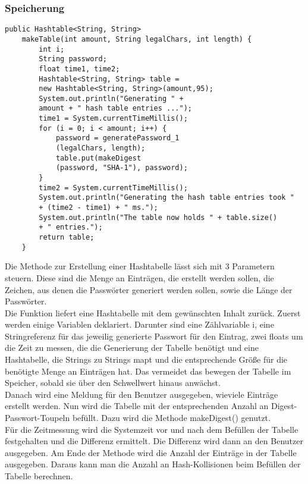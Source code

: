 \documentclass[11pt]{article}
\begin{document}
\subsubsection{Speicherung}
\begin{lstlisting}[caption=Algorithmus zur Füllung der Hashtabelle, label=lst:makeTable]
    public Hashtable<String, String> 
    makeTable(int amount, String legalChars, int length) {
        int i;
        String password;
        float time1, time2;
        Hashtable<String, String> table = 
        new Hashtable<String, String>(amount,95);
        System.out.println("Generating " + 
        amount + " hash table entries ...");
        time1 = System.currentTimeMillis();
        for (i = 0; i < amount; i++) {
            password = generatePassword_1
            (legalChars, length);
            table.put(makeDigest
            (password, "SHA-1"), password);
        }
        time2 = System.currentTimeMillis();
        System.out.println("Generating the hash table entries took " 
        + (time2 - time1) + " ms.");
        System.out.println("The table now holds " + table.size() 
        + " entries.");
        return table;
    }
\end{lstlisting}
Die Methode zur Erstellung einer Hashtabelle lässt sich mit 3 Parametern steuern. Diese sind die Menge an Einträgen, die erstellt werden sollen, die Zeichen, aus denen die Passwörter generiert werden sollen, sowie die Länge der Passwörter.\\
Die Funktion liefert eine Hashtabelle mit dem gewünschten Inhalt zurück.
Zuerst werden einige Variablen deklariert. Darunter sind eine Zählvariable i, eine Stringreferenz für das jeweilig generierte Passwort für den Eintrag, zwei floats um die Zeit zu messen, die die Generierung der Tabelle benötigt und eine Hashtabelle, die Strings zu Strings mapt und die entsprechende Größe für die benötigte Menge an Einträgen hat. Das vermeidet das bewegen der Tabelle im Speicher, sobald sie über den Schwellwert hinaus anwächst.\\
Danach wird eine Meldung für den Benutzer ausgegeben, wieviele Einträge erstellt werden.
Nun wird die Tabelle mit der entsprechenden Anzahl an Digest-Passwort-Toupeln befüllt. Dazu wird die Methode makeDigest() genutzt.\\
Für die Zeitmessung wird die Systemzeit vor und nach dem Befüllen der Tabelle festgehalten und die Differenz ermittelt. Die Differenz wird dann an den Benutzer ausgegeben. Am Ende der Methode wird die Anzahl der Einträge in der Tabelle ausgegeben. Daraus kann man die Anzahl an Hash-Kollisionen beim Befüllen der Tabelle berechnen.
\end{document}
